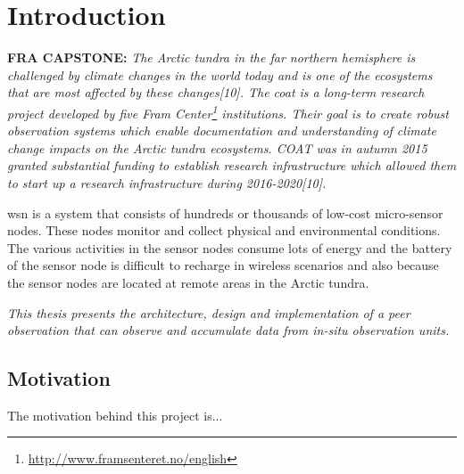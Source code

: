 \documentclass[USenglish]{uit-thesis}
\begin{document}
\printglossary


\mainmatter

\chapter{Introduction}
\textbf{FRA CAPSTONE:}
\textit{The Arctic tundra in the far northern hemisphere is challenged by climate changes in the world today and is one of the ecosystems that are most affected by these changes[10]. The \gls{coat} is a long-term research project developed by five Fram Center\footnote{\url{http://www.framsenteret.no/english}} institutions. Their goal is to create robust observation systems which enable documentation and understanding of climate change impacts on the Arctic tundra ecosystems. COAT was in autumn 2015 granted substantial funding to establish research infrastructure which allowed them to start up a research infrastructure during 2016-2020[10].}


\Gls{wsn} is a system that consists of hundreds or thousands of low-cost micro-sensor nodes. These nodes monitor and collect physical and environmental conditions. The various activities  in the sensor nodes consume lots of energy and the battery of the sensor node is difficult to recharge in wireless scenarios and also because the sensor nodes are located at remote areas in the Arctic tundra.



\textit{This thesis presents the architecture, design and implementation of a peer observation that can observe and accumulate data from in-situ observation units.}

\section{Motivation}
The motivation behind this project is...


\end{document}
